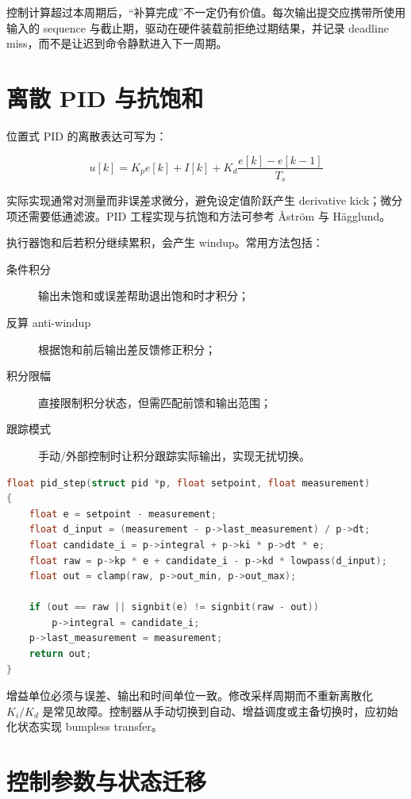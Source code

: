 控制计算超过本周期后，“补算完成”不一定仍有价值。每次输出提交应携带所使用输入的 sequence 与截止期，驱动在硬件装载前拒绝过期结果，并记录 deadline miss，而不是让迟到命令静默进入下一周期。

\section{离散 PID 与抗饱和}

位置式 PID 的离散表达可写为：

\begin{equation}
  u[k]=K_p e[k]+I[k]+K_d\frac{e[k]-e[k-1]}{T_s}
\end{equation}

实际实现通常对测量而非误差求微分，避免设定值阶跃产生 derivative kick；微分项还需要低通滤波。PID 工程实现与抗饱和方法可参考 Åström 与 Hägglund\cite{astrom-hagglund-pid}。

执行器饱和后若积分继续累积，会产生 windup。常用方法包括：

\begin{description}
  \item[条件积分] 输出未饱和或误差帮助退出饱和时才积分；
  \item[反算 anti-windup] 根据饱和前后输出差反馈修正积分；
  \item[积分限幅] 直接限制积分状态，但需匹配前馈和输出范围；
  \item[跟踪模式] 手动/外部控制时让积分跟踪实际输出，实现无扰切换。
\end{description}

\begin{lstlisting}[language=C,caption={带条件积分和输出限幅的 PID 骨架}]
float pid_step(struct pid *p, float setpoint, float measurement)
{
    float e = setpoint - measurement;
    float d_input = (measurement - p->last_measurement) / p->dt;
    float candidate_i = p->integral + p->ki * p->dt * e;
    float raw = p->kp * e + candidate_i - p->kd * lowpass(d_input);
    float out = clamp(raw, p->out_min, p->out_max);

    if (out == raw || signbit(e) != signbit(raw - out))
        p->integral = candidate_i;
    p->last_measurement = measurement;
    return out;
}
\end{lstlisting}

增益单位必须与误差、输出和时间单位一致。修改采样周期而不重新离散化 $K_i/K_d$ 是\mbox{常见故障}。控制器从手动切换到自动、增益调度或主备切换时，应初始化状态实现 bumpless transfer。

\section{控制参数与状态迁移}

